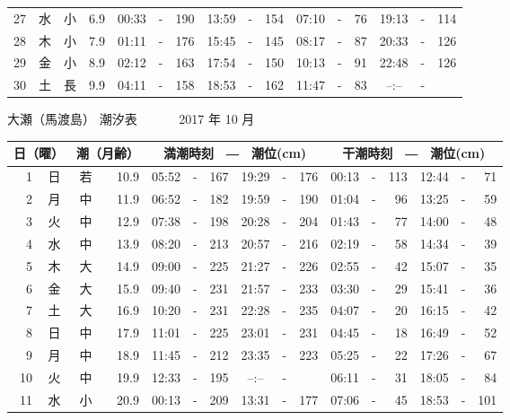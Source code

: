 \documentclass[12pt.a4j]{jsarticle}
\begin{document}
\begin{center}
\begin{table}[ht]
\begin{tabular}{|rc|cr|ccrccr|ccrccr|}
27 & 水 & 小 &  6.9 &  00:33 &-& 190  &  13:59 &-& 154  &   07:10 &-&  76  &   19:13 &-& 114  \\
28 & 木 & 小 &  7.9 &  01:11 &-& 176  &  15:45 &-& 145  &   08:17 &-&  87  &   20:33 &-& 126  \\
29 & 金 & 小 &  8.9 &  02:12 &-& 163  &  17:54 &-& 150  &   10:13 &-&  91  &   22:48 &-& 126  \\
30 & 土 & 長 &  9.9 &  04:11 &-& 158  &  18:53 &-& 162  &   11:47 &-&  83  &   --:-- &-&     \\
   \hline
   \end{tabular}
\end{table}
\newpage
 {\LARGE 大瀬（馬渡島）  潮汐表　　　}
 {\large 2017 年 10 月}\\
 \begin{table}[ht]
    \begin{tabular}{|rc|cr|ccrccr|ccrccr|}
    \hline
    \multicolumn{2}{|c|}{日（曜）} & \multicolumn{2}{c|}{潮（月齢）} & \multicolumn{6}{c|}{満潮時刻　―　潮位(cm)} & \multicolumn{6}{c|}{干潮時刻　―　潮位(cm)} \\
 \hline
 1 & 日 & 若 & 10.9 &  05:52 &-& 167  &  19:29 &-& 176  &   00:13 &-& 113  &   12:44 &-&  71  \\
 2 & 月 & 中 & 11.9 &  06:52 &-& 182  &  19:59 &-& 190  &   01:04 &-&  96  &   13:25 &-&  59  \\
 3 & 火 & 中 & 12.9 &  07:38 &-& 198  &  20:28 &-& 204  &   01:43 &-&  77  &   14:00 &-&  48  \\
 4 & 水 & 中 & 13.9 &  08:20 &-& 213  &  20:57 &-& 216  &   02:19 &-&  58  &   14:34 &-&  39  \\
 5 & 木 & 大 & 14.9 &  09:00 &-& 225  &  21:27 &-& 226  &   02:55 &-&  42  &   15:07 &-&  35  \\
 6 & 金 & 大 & 15.9 &  09:40 &-& 231  &  21:57 &-& 233  &   03:30 &-&  29  &   15:41 &-&  36  \\
 7 & 土 & 大 & 16.9 &  10:20 &-& 231  &  22:28 &-& 235  &   04:07 &-&  20  &   16:15 &-&  42  \\
 8 & 日 & 中 & 17.9 &  11:01 &-& 225  &  23:01 &-& 231  &   04:45 &-&  18  &   16:49 &-&  52  \\
 9 & 月 & 中 & 18.9 &  11:45 &-& 212  &  23:35 &-& 223  &   05:25 &-&  22  &   17:26 &-&  67  \\
10 & 火 & 中 & 19.9 &  12:33 &-& 195  &  --:-- &-&     &   06:11 &-&  31  &   18:05 &-&  84  \\
11 & 水 & 小 & 20.9 &  00:13 &-& 209  &  13:31 &-& 177  &   07:06 &-&  45  &   18:53 &-& 101  \\

\end{tabular}
\end{table}
\end{center}
\end{document}
